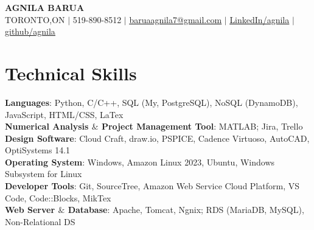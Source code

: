 \documentclass[letterpaper,11pt]{article}
\begin{document}

\begin{center}
    \textbf{\LARGE \scshape AGNILA BARUA} \\ \vspace{1pt}
    \small TORONTO,ON $|$ 519-890-8512 $|$ \href{mailto:baruaagnila7@gmail.com}{\underline{baruaagnila7@gmail.com}} $|$ 
    \href{https://www.linkedin.com/in/agnila-barua/}{\underline{LinkedIn/agnila}} $|$
    \href{https://github.com/agnila7}{\underline{github/agnila}}
\end{center}





\section{Technical Skills}
 \begin{itemize}[leftmargin=0.15in, label={}]
    \small{\item{
     \textbf{Languages}{: Python, C/C++, SQL (My, PostgreSQL), NoSQL (DynamoDB), JavaScript, HTML/CSS, LaTex} \\
     \textbf{Numerical Analysis $\&$ Project Management Tool}{: MATLAB; Jira, Trello } \\
     \textbf{Design Software}{: Cloud Craft, draw.io, PSPICE, Cadence Virtuoso, AutoCAD, OptiSystems 14.1 } \\
     \textbf{Operating System}{: Windows, Amazon Linux 2023, Ubuntu, Windows Subsystem for Linux} \\
     \textbf{Developer Tools}{: Git, SourceTree, Amazon Web Service Cloud Platform, VS Code, Code::Blocks, MikTex} \\
     \textbf{Web Server $\&$ Database}{: Apache, Tomcat, Ngnix; RDS (MariaDB, MySQL), Non-Relational DS}
    }}
 \end{itemize}
\end{document}

